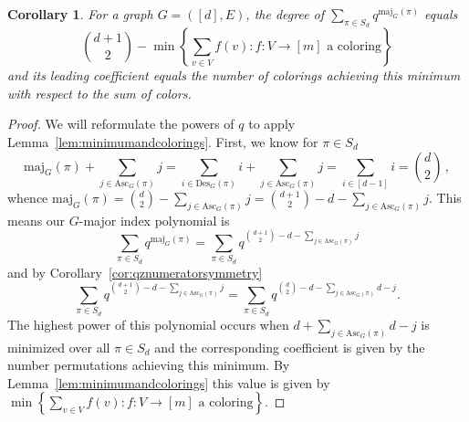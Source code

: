 \documentclass[11pt]{amsart}
\newtheorem{corollary}[theorem]{Corollary}
\newcommand{\maj}{\mathrm{maj}}
\newcommand{\des}{\mathrm{Des}}
\newcommand{\asc}{\mathrm{Asc}}
\begin{document}
\begin{corollary}\label{cor:gmajordegree}
    For a graph $G=([d],E)$, the degree of $\sum_{\pi \in S_d} q^{\maj_G(\pi)}$ equals
    \[
        \binom{d+1}{2} - \min\left\{ \sum_{v \in V} f(v): f:V \to [m] \text{ a coloring} \right\}
    \]
    and its leading coefficient equals the number of colorings achieving this minimum with respect to the sum of colors.
\end{corollary}
\begin{proof}
    We will reformulate the powers of $q$ to apply Lemma~\ref{lem:minimumandcolorings}.
    First, we know for $\pi \in S_d$
    \[
        \maj_G(\pi) + \sum_{j \in \asc_G(\pi)} j =  \sum_{i \in \des_G(\pi)} i + \sum_{j \in \asc_G(\pi)} j =
\sum_{i \in [d-1]} i = \binom{d}{2} \, ,
    \]
    whence $\maj_G(\pi) = \binom{d}{2} - \sum_{j \in \asc_G(\pi)} j = \binom{d+1}{2} - d - \sum_{j \in \asc_G(\pi)} j $.
    This means our $G$-major index polynomial is  
    \[
        \sum_{\pi \in S_d} q^{\maj_G(\pi)} = \sum_{\pi \in S_d} q^{\binom{d+1}{2} - d - \sum_{j \in \asc_G(\pi)} j}
    \]
    and by Corollary~\ref{cor:qznumeratorsymmetry}
    \[
        \sum_{\pi \in S_d} q^{\binom{d+1}{2} - d-\sum_{j \in \asc_G(\pi)} j} = \sum_{\pi \in S_d} q^{\binom{d}{2} - d -\sum_{j \in \asc_G(\pi)} d-j}.
    \]
    The highest power of this polynomial occurs when $ d +\sum_{j \in \asc_G(\pi)} d-j$ is minimized over all
$\pi \in S_d$ and the corresponding coefficient is given by the number permutations achieving this minimum. By Lemma~\ref{lem:minimumandcolorings} this value is given by $\min\left\{ \sum_{v \in V} f(v): f:V \to [m] \text{ a coloring} \right\}$. 
\end{proof}
\end{document}
